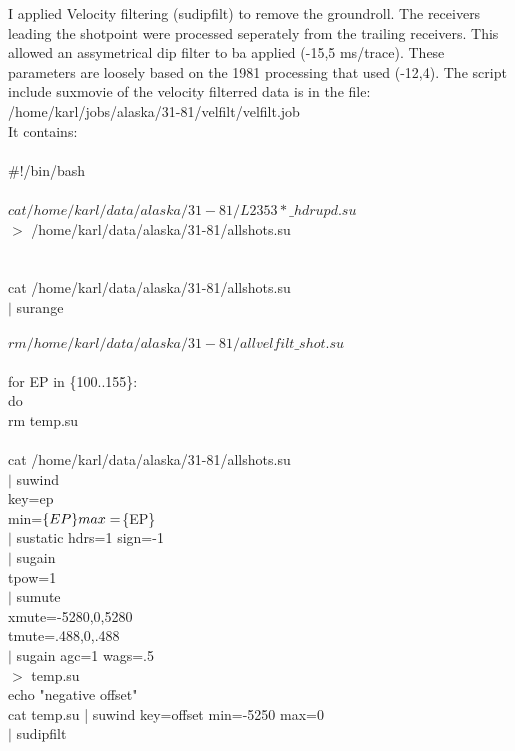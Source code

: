 I applied Velocity filtering (sudipfilt) to remove the groundroll.  The receivers leading the shotpoint were processed seperately from the trailing receivers.  This allowed an assymetrical dip filter to ba applied (-15,5 ms/trace).  These parameters are loosely based on the 1981 processing that used (-12,4). The script include suxmovie of the velocity filterred data is in the file: \\
/home/karl/jobs/alaska/31-81/velfilt/velfilt.job \\
It contains: \\
 \\
\#!/bin/bash \\
 \\
$cat /home/karl/data/alaska/31-81/L2353*\_hdrupd.su$ \ \\
$>$ /home/karl/data/alaska/31-81/allshots.su  \\
 \\
 \\
cat /home/karl/data/alaska/31-81/allshots.su \ \\
$|$ surange \\
 \\
$rm /home/karl/data/alaska/31-81/allvelfilt\_shot.su$ \\
 \\
for EP in \{100..155\}: \\
do \\
    rm temp.su \\
 \\
    cat /home/karl/data/alaska/31-81/allshots.su \ \\
    $|$ suwind \ \\
        key=ep \ \\
        min=$\{EP\} \ \\
        max=$\{EP\} \ \\
    $|$ sustatic hdrs=1 sign=-1 \ \\
    $|$ sugain \ \\
        tpow=1 \ \\
    $|$ sumute \ \\
        xmute=-5280,0,5280 \ \\
	tmute=.488,0,.488 \ \\
    $|$ sugain  agc=1 wags=.5  \ \\
$>$ temp.su \\
echo "negative offset" \\
cat temp.su | suwind key=offset min=-5250 max=0 \ \\
    $|$ sudipfilt \ \\
